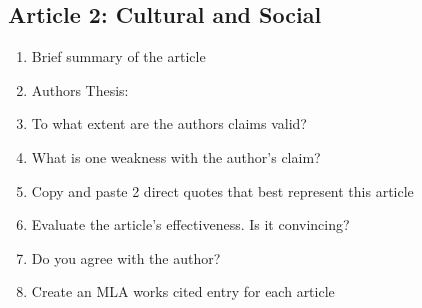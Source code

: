 \documentclass[11pt]{article}
\begin{document}
\subsection{Article 2: Cultural and Social}
\label{sec:org46199cf}
\begin{enumerate}
\item Brief summary of the article
\item Authors Thesis:
\item To what extent are the authors claims valid?
\item What is one weakness with the author's claim?
\item Copy and paste 2 direct quotes that best represent this article
\item Evaluate the article's effectiveness. Is it convincing?
\item Do you agree with the author?
\item Create an MLA works cited entry for each article
\end{enumerate}
\end{document}
